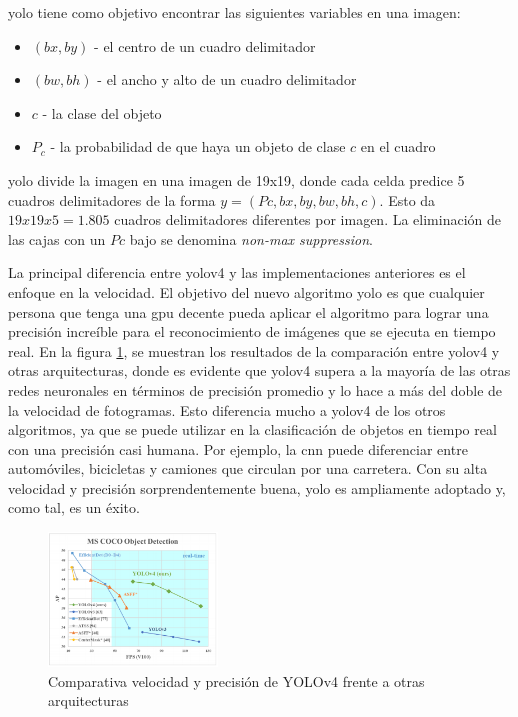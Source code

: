 \gls{yolo} tiene como objetivo encontrar las siguientes variables en una imagen:

\begin{itemize}
    \item $(bx, by)$ - el centro de un cuadro delimitador
    \item $(bw, bh)$ - el ancho y alto de un cuadro delimitador
    \item $c$ - la clase del objeto
    \item $P_c$ - la probabilidad de que haya un objeto de clase $c$ en el cuadro
\end{itemize}

\gls{yolo} divide la imagen en una imagen de 19x19, donde cada celda predice 5 cuadros delimitadores de la forma $y = (Pc, bx, by, bw, bh, c)$. Esto da $19x19x5 = 1.805$ cuadros delimitadores diferentes por imagen. La eliminación de las cajas con un $Pc$ bajo se denomina \textit{non-max suppression}.

La principal diferencia entre \gls{yolov4} y las implementaciones anteriores es el enfoque en la velocidad. El objetivo del nuevo algoritmo \gls{yolo} es que cualquier persona que tenga una \gls{gpu} decente pueda aplicar el algoritmo para lograr una precisión increíble para el reconocimiento de imágenes que se ejecuta en tiempo real. En la figura \ref{fig:yolov4-speed-accuracy-vs-others}, se muestran los resultados de la comparación entre \gls{yolov4} y otras arquitecturas, donde es evidente que \gls{yolov4} supera a la mayoría de las otras redes neuronales en términos de precisión promedio y lo hace a más del doble de la velocidad de fotogramas. Esto diferencia mucho a \gls{yolov4} de los otros algoritmos, ya que se puede utilizar en la clasificación de objetos en tiempo real con una precisión casi humana. Por ejemplo, la \gls{cnn} puede diferenciar entre automóviles, bicicletas y camiones que circulan por una carretera. Con su alta velocidad y precisión sorprendentemente buena, \gls{yolo} es ampliamente adoptado y, como tal, es un éxito.

\begin{figure}[ht]
\centering
\includegraphics[width=0.4\textwidth]{img/chapters/estado-del-arte/yolov4-vs-others.png}
\caption{\label{fig:yolov4-speed-accuracy-vs-others}Comparativa velocidad y precisión de YOLOv4 frente a otras arquitecturas}
\end{figure}

